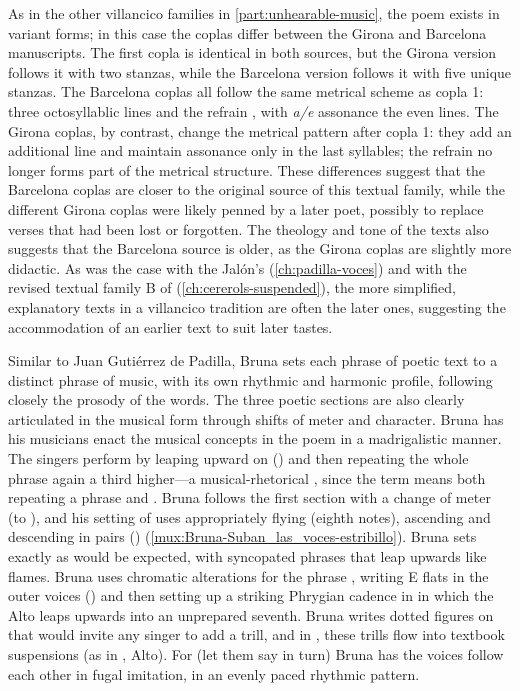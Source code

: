 As in the other villancico families in \cref{part:unhearable-music}, the poem
exists in variant forms; in this case the coplas differ between the Girona and
Barcelona manuscripts.
The first copla is identical in both sources, but the Girona version follows it
with two stanzas, while the Barcelona version follows it with five unique
stanzas.
The Barcelona coplas all follow the same metrical scheme as copla 1: three
octosyllablic lines and the refrain , with \emph{a/e} assonance
the even lines.
The Girona coplas, by contrast, change the metrical pattern after copla 1: they
add an additional line and maintain assonance only in the last syllables; the
 refrain no longer forms part of the metrical structure.
These differences suggest that the Barcelona coplas are closer to the original
source of this textual family, while the different Girona coplas were likely
penned by a later poet, possibly to replace verses that had been lost or
forgotten.
The theology and tone of the texts also suggests that the Barcelona source is
older, as the Girona coplas are slightly more didactic.
As was the case with the Jalón's 
(\cref{ch:padilla-voces}) and with the revised textual family B of
 (\cref{ch:cererols-suspended}), the more simplified,
explanatory texts in a villancico tradition are often the later ones,
suggesting the accommodation of an earlier text to suit later tastes.

Similar to Juan Gutiérrez de Padilla, Bruna sets each phrase of poetic text to
a distinct phrase of music, with its own rhythmic and harmonic profile,
following closely the prosody of the words.  
The three poetic sections are also clearly articulated in the musical form
through shifts of meter and character.
Bruna has his musicians enact the musical concepts in the poem in a
madrigalistic manner.  
The singers perform  by leaping upward on
 () and then repeating the whole phrase again a
third higher---a musical-rhetorical , since the term means both
repeating a phrase and .
Bruna follows the first section with a change of meter (to \meterC), and his
setting of  uses appropriately
flying  (eighth notes), ascending and descending in pairs
() (\cref{mux:Bruna-Suban_las_voces-estribillo}).
Bruna sets  exactly as would be expected, with
syncopated phrases that leap upwards like flames.
Bruna uses chromatic alterations for the phrase ,
writing E flats in the outer voices () and then setting up a
striking Phrygian cadence in  in which the Alto leaps upwards
into an unprepared seventh.  
Bruna writes dotted figures on  that would
invite any singer to add a trill, and in , these trills flow
into textbook suspensions (as in , Alto).
For  (let them say in turn) Bruna has the voices follow
each other in fugal imitation, in an evenly paced rhythmic pattern.

